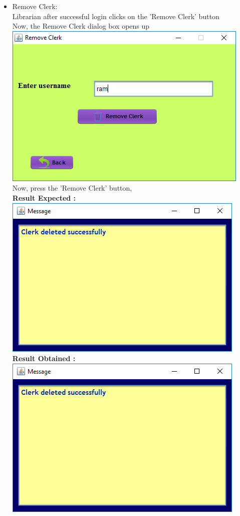 \documentclass{article}
\begin{document}
\begin{enumerate}
\begin{itemize}
\item Remove Clerk:\\
Librarian after successful login clicks on the 'Remove Clerk' button\\
Now, the Remove Clerk dialog box opens up\\
\includegraphics[scale=0.8]{images/LibrarianLogin/Actions/DeleteClerk/DeleteScreen.PNG}\\
Now, press the 'Remove Clerk' button,\\
\textbf{Result Expected :}\\
\includegraphics[scale=0.8]{images/LibrarianLogin/Actions/DeleteClerk/ClerkDeleted.PNG}\\
\textbf{Result Obtained :}\\
\includegraphics[scale=0.8]{images/LibrarianLogin/Actions/DeleteClerk/ClerkDeleted.PNG}\\


\end{itemize}
\end{enumerate}
\end{document}
